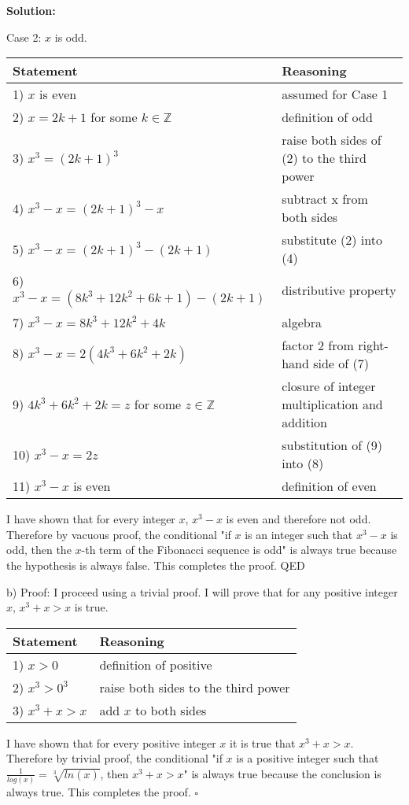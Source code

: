 \documentclass{article}
\newenvironment{solution}
{
\par
\color{blue}
\textbf{Solution:}
}
{
\par
}
\begin{document}
\begin{enumerate}
\begin{solution}
    Case 2: $x$ is odd.
    
    \begin{tabular}{l|l}
    Statement & Reasoning \\ \hline
    1) $x$ is even & assumed for Case 1\\
    2) $x = 2k + 1$ for some $k \in \mathbb{Z}$ & definition of odd\\
    3) $x^3 = (2k + 1)^3$ & raise both sides of (2) to the third power\\
    4) $x^3 - x = (2k + 1)^3 - x$ & subtract x from both sides\\
    5) $x^3 - x = (2k + 1)^3 - (2k + 1)$ & substitute (2) into (4)\\
    6) $x^3 - x = (8k^3 + 12k^2 + 6k + 1) - (2k + 1)$ & distributive property\\
    7) $x^3 - x = 8k^3 + 12k^2 + 4k$ & algebra\\
    8) $x^3 - x = 2(4k^3 + 6k^2 + 2k)$ & factor 2 from right-hand side of (7)\\
    9) $4k^3 + 6k^2 + 2k = z$ for some $z \in \mathbb{Z}$ & closure of integer multiplication and addition\\
    10) $x^3 - x = 2z$ & substitution of (9) into (8)\\
    11) $x^3 - x$ is even & definition of even
    \end{tabular}
    
    I have shown that for every integer $x$, $x^3 - x$ is even and therefore not odd. Therefore by vacuous proof, the conditional "if $x$ is an integer such that $x^3 - x$ is odd, then the $x$-th term of the Fibonacci sequence is odd" is always true because the hypothesis is always false. This completes the proof. QED
    
    b) Proof: I proceed using a trivial proof. I will prove that for any positive integer $x$, $x^3 + x > x$ is true.
    
    \begin{tabular}{l|l}
    Statement & Reasoning \\ \hline
    1) $x > 0$ & definition of positive\\
    2) $x^3 > 0^3$ & raise both sides to the third power\\
    3) $x^3 + x > x$ & add $x$ to both sides\\
    \end{tabular}
    
    I have shown that for every positive integer $x$ it is true that $x^3 + x > x$. Therefore by trivial proof, the conditional "if $x$ is a positive integer such that $\frac{1}{log(x)} = \sqrt[3]{ln(x)}$, then $x^3 + x > x$" is always true because the conclusion is always true. This completes the proof. $\square$
    
    \end{solution}
   
\end{enumerate}
\end{document}
